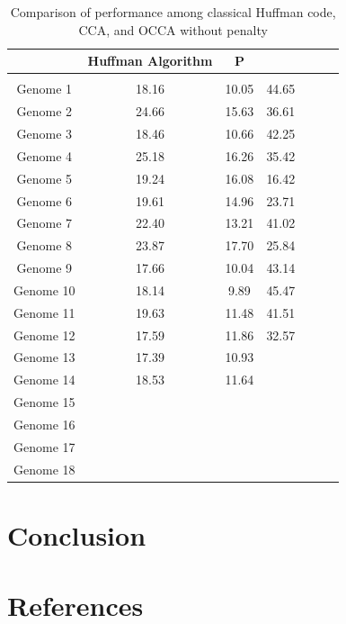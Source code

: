 \documentclass[preprint,12pt]{elsarticle}
\begin{document}
\begin{table}[h]
\renewcommand{\arraystretch}{1.1}
\small
\label{table4}
\caption{Comparison of performance among classical Huffman code, CCA, and OCCA without penalty}

\begin{tabular}{c  c c  c c  c c}
\hline
 & Huffman Algorithm & P \\\hline
\\\hline
Genome 1& 18.16 & 10.05 & 44.65 \\\hline
Genome 2& 24.66 &  15.63 & 36.61 \\\hline
Genome 3&18.46 &  10.66&  42.25\\\hline
Genome 4&25.18&16.26& 35.42\\\hline
Genome 5& 19.24& 16.08 &16.42 \\\hline
Genome 6& 19.61&14.96&23.71\\\hline
Genome 7& 22.40 &13.21&41.02\\\hline
Genome 8&23.87 & 17.70 &25.84\\\hline
Genome 9&17.66 &10.04&43.14\\\hline
Genome 10& 18.14 &9.89& 45.47 \\\hline
Genome 11&19.63&11.48&41.51 \\\hline
Genome 12& 17.59&11.86&32.57 \\\hline
Genome 13& 17.39&10.93&\\\hline
Genome 14&18.53 &11.64& \\\hline
Genome 15& && \\\hline
Genome 16&&& \\\hline
Genome 17& && \\\hline
Genome 18& && \\\hline

\end{tabular}
\end{table}
\section{Conclusion}





\section*{References}


\end{document}
